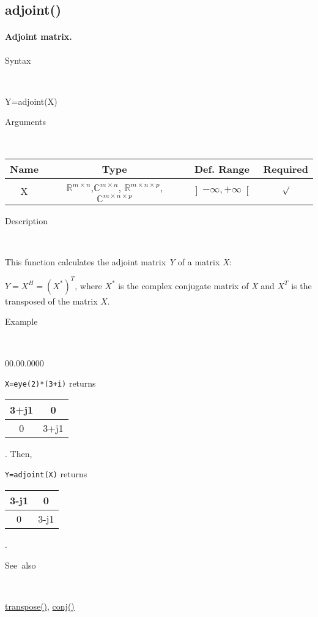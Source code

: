 \subsection*{\hypertarget{adjoint}{}{\Large adjoint()}}


\paragraph{\textmd{\label{par:Adjoint-matrix.}}Adjoint matrix.}

\begin{description}
\item [Syntax]~
\end{description}
Y=adjoint(X)

\begin{description}
\item [Arguments]~
\end{description}
\begin{tabular}{|c|c|c|c|}
\hline 
Name&
Type&
Def. Range&
Required\tabularnewline
\hline
\hline 
X&
$\mathbb{\mathbb{R}}^{m\times n}$,$\mathbb{\mathbb{C}}^{m\times n}$,
$\mathbb{\mathbb{R}}^{m\times n\times p}$, $\mathbb{\mathbb{C}}^{m\times n\times p}$ &
$\left]-\infty,+\infty\right[$&
$\surd$\tabularnewline
\hline
\end{tabular}

\begin{description}
\item [Description]~
\end{description}
This function calculates the adjoint matrix \textit{Y} of a matrix
\textit{X}:

\medskip{}
$Y=X^{H}=\left(X^{*}\right)^{T}$, where $X^{*}$ is the complex
conjugate matrix of \textit{X} and $X^{T}$ is the transposed of the
matrix $X$.
\medskip{}

\begin{description}
\item [Example]~
\end{description}
\begin{lyxlist}{00.00.0000}
\item [\texttt{X=eye(2){*}(3+i)}]returns \begin{tabular}{|c|c|}
\hline 
3+j1&
0\tabularnewline
\hline
0&
3+j1\tabularnewline
\hline
\end{tabular}. Then,
\item [\texttt{Y=adjoint(X)}]returns \begin{tabular}{|c|c|}
\hline 
3-j1&
0\tabularnewline
\hline
0&
3-j1\tabularnewline
\hline
\end{tabular}.
\end{lyxlist}
\begin{description}
\item [See~also]~
\end{description}
\textcolor{blue}{\hyperlink{transpose}{transpose()}}, \textcolor{blue}{\hyperlink{conj}{conj()}}


